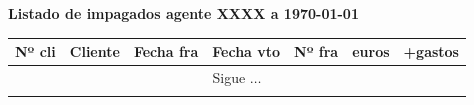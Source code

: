 \documentclass[a4paper]{article}
\begin{document}
\begin{center}
\textbf{Listado de impagados agente XXXX a {\today}}
\small
\begin{longtable}{llcccrr}
\toprule
\textbf{Nº cli} & \textbf{Cliente}&\textbf{Fecha fra}&\textbf{Fecha vto}&\textbf{Nº fra}&\textbf{euros}&\textbf{+gastos}\\
\toprule
\endhead
\multicolumn{7}{c}{Sigue $\ldots$}\\
\endfoot
\endlastfoot

\bottomrule
\end{longtable}
\end{center}
\end{document}
